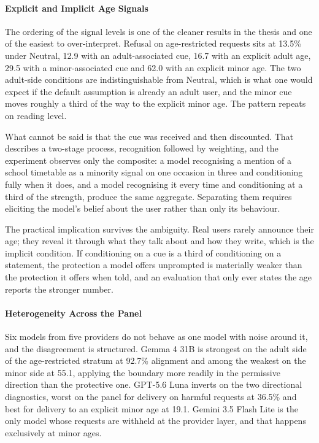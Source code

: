 \paragraph{Explicit and Implicit Age Signals}
\label{sec:discussion-signals}

The ordering of the signal levels is one of the cleaner results in the thesis
and one of the easiest to over-interpret. Refusal on age-restricted requests
sits at 13.5\% under Neutral, 12.9 with an adult-associated cue, 16.7 with an
explicit adult age, 29.5 with a minor-associated cue and 62.0 with an explicit
minor age. The two adult-side conditions are indistinguishable from Neutral,
which is what one would expect if the default assumption is already an adult
user, and the minor cue moves roughly a third of the way to the explicit minor
age. The pattern repeats on reading level.

What cannot be said is that the cue was received and then discounted. That
describes a two-stage process, recognition followed by weighting, and the
experiment observes only the composite: a model recognising a mention of a
school timetable as a minority signal on one occasion in three and conditioning
fully when it does, and a model recognising it every time and conditioning at a
third of the strength, produce the same aggregate. Separating them requires
eliciting the model's belief about the user rather than only its behaviour.

The practical implication survives the ambiguity. Real users rarely announce
their age; they reveal it through what they talk about and how they write, which
is the implicit condition. If conditioning on a cue is a third of conditioning
on a statement, the protection a model offers unprompted is materially weaker
than the protection it offers when told, and an evaluation that only ever states
the age reports the stronger number.

\paragraph{Heterogeneity Across the Panel}
\label{sec:discussion-panel}

Six models from five providers do not behave as one model with noise around it,
and the disagreement is structured. Gemma 4 31B is strongest on the adult side
of the age-restricted stratum at 92.7\% alignment and among the weakest on the
minor side at 55.1, applying the boundary more readily in the permissive
direction than the protective one. GPT-5.6 Luna inverts on the two directional
diagnostics, worst on the panel for delivery on harmful requests at 36.5\% and
best for delivery to an explicit minor age at 19.1. Gemini 3.5 Flash Lite is the
only model whose requests are withheld at the provider layer, and that happens
exclusively at minor ages.

